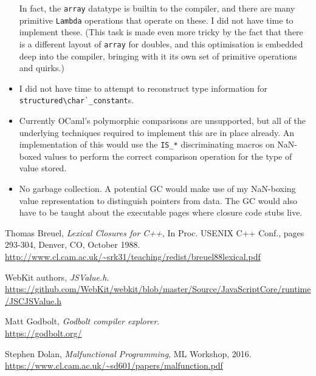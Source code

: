 \documentclass[12pt,a4paper,twoside,openright]{report}
\begin{document}
\begin{itemize}
      In fact, the \lstinline!array! datatype is builtin to the compiler, and there
      are many primitive \lstinline!Lambda! operations that operate on these.
      I did not have time to implement these. (This task is made even more tricky by
      the fact that there is a different layout of \lstinline!array! for doubles,
      and this optimisation is embedded deep into the compiler, bringing with it
      its own set of primitive operations and quirks.)
  \item I did not have time to attempt to reconstruct type information for \lstinline!structured\char`_constant!s.
  \item Currently OCaml's polymorphic comparisons are unsupported, but all of the
      underlying techniques required to implement this are in place already. An
      implementation of this would use the \lstinline!IS_*! discriminating
      macros on NaN-boxed values to perform the correct comparison operation for
      the type of value stored.
  \item No garbage collection. A potential GC would make use of my NaN-boxing
      value representation to distinguish pointers from data. The GC would also
      have to be taught about the executable pages where closure code stubs live.
\end{itemize}


\begin{thebibliography}{1}

  Thomas Breuel,
  \emph{Lexical Closures for C++},
  In Proc. USENIX C++ Conf., pages 293-304,
  Denver, CO, October 1988.  \\ \url{http://www.cl.cam.ac.uk/~srk31/teaching/redist/breuel88lexical.pdf}

  WebKit authors,
  \emph{JSValue.h}.
  \\ \url{https://github.com/WebKit/webkit/blob/master/Source/JavaScriptCore/runtime/JSCJSValue.h}

  Matt Godbolt,
  \emph{Godbolt compiler explorer}.
  \\ \url{https://godbolt.org/}

  Stephen Dolan,
  \emph{Malfunctional Programming},
  ML Workshop, 2016.  \\ \url{https://www.cl.cam.ac.uk/~sd601/papers/malfunction.pdf}

\end{thebibliography}
\end{document}
